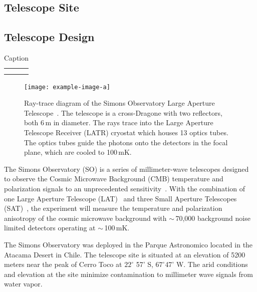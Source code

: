 \subsection{Telescope Site}

\subsection{Telescope Design}

\begin{table}[]
    \centering
    \begin{tabular}{c|c}
         &  \\
         & 
    \end{tabular}
    \caption{Caption}
    \label{tab:inst_optics}
\end{table}

\begin{figure}[t]
    \centering
    \texttt{[image: example-image-a]}
    \caption{Ray-trace diagram of the Simons Observatory Large Aperture Telescope~\cite{XX}.  The telescope is a cross-Dragone with two reflectors, both 6\,m in diameter.  The rays trace into the Large Aperture Telescope Receiver (LATR) cryostat which houses 13 optics tubes.  The optics tubes guide the photons onto the detectors in the focal plane, which are cooled to 100\,mK.}
    \label{fig:so_inst}
\end{figure}

The Simons Observatory (SO) is a series of millimeter-wave telescopes designed to observe the Cosmic Microwave Background (CMB) temperature and polarization signals to an unprecedented sensitivity~\cite{gali18, so19}. With the combination of one Large Aperture Telescope (LAT)~\cite{xu/etal:2020c, zhu18, orlo18, coppi/etal:2018} and three Small Aperture Telescopes (SAT)~\cite{ali20}, the experiment will measure the temperature and polarization anisotropy of the cosmic microwave background with $\sim$\,70,000 background noise limited detectors operating at $\sim$\,100\,mK. 

The Simons Observatory was deployed in the Parque Astronomico located in the Atacama Desert in Chile. The telescope site is situated at an elevation of 5200 meters near the peak of Cerro Toco at $22 ^\circ$ 57' S, $67^\circ$47' W. The arid conditions and elevation at the site minimize contamination to millimeter wave signals from water vapor. 

